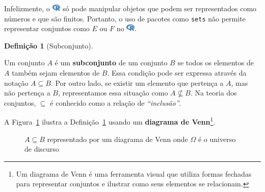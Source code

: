 \documentclass[
  letterpaper,
]{book}
\theoremstyle{plain}
\theoremstyle{definition}
\newtheorem{definition}{Definição}[chapter]
\theoremstyle{remark}
\begin{document}
Infelizmente, o
\includegraphics[width=1.13em,height=1em]{naive_set_theory_files/figure-pdf/fa-icon-9b00320707d42527dde67262afb33ded.pdf}
só pode manipular objetos que podem ser representados como números e que
são finitos. Portanto, o uso de pacotes como \texttt{sets} não permite
representar conjuntos como \(E\) ou \(F\) no
\includegraphics[width=1.13em,height=1em]{naive_set_theory_files/figure-pdf/fa-icon-9b00320707d42527dde67262afb33ded.pdf}.

\begin{definition}[Subconjunto]\protect\hypertarget{def-subset}{}\label{def-subset}

Um conjunto \(A\) é um \textbf{subconjunto} de um conjunto \(B\) se
todos os elementos de \(A\) também sejam elementos de \(B\). Essa
condição pode ser expressa através da notação \(A \subseteq B\). Por
outro lado, se existir um elemento que pertença a \(A\), mas não
pertença a \(B\), representamos essa situação como \(A \nsubseteq B\).
Na teoria dos conjuntos, \(\subseteq\) é conhecido como a relação de
\emph{``inclusão''}.

\end{definition}

A Figura~\ref{fig-subset-venn-diagram} ilustra a
Definição~\ref{def-subset} usando um \textbf{diagrama de
Venn}\footnote{Um diagrama de Venn é uma ferramenta visual que utiliza
  formas fechadas para representar conjuntos e ilustrar como seus
  elementos se relacionam.}.

\begin{figure}


\caption{\label{fig-subset-venn-diagram}\(A \subseteq B\) representado
por um diagrama de Venn onde \(\Omega\) é o universo de discurso}

\end{figure}%
\end{document}
